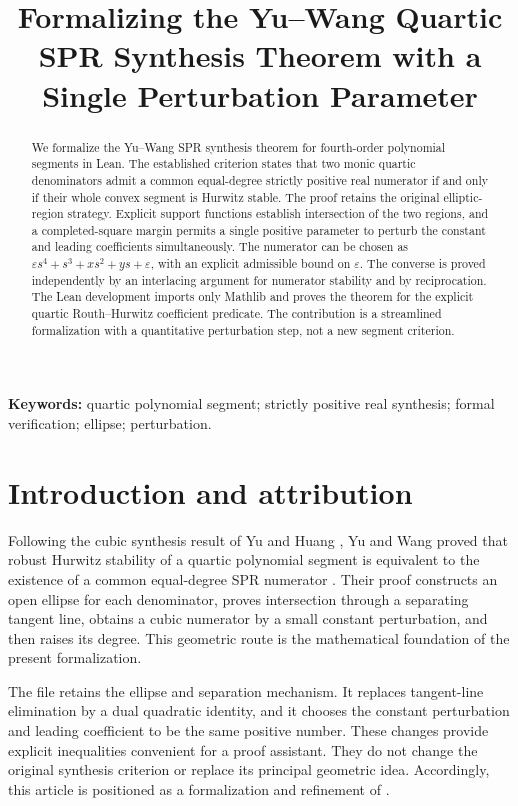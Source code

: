 \documentclass[11pt]{article}
\title{Formalizing the Yu--Wang Quartic SPR Synthesis Theorem with a Single Perturbation Parameter}
\begin{document}
\maketitle
\begin{abstract}
We formalize the Yu--Wang SPR synthesis theorem for fourth-order polynomial segments in Lean. The established criterion states that two monic quartic denominators admit a common equal-degree strictly positive real numerator if and only if their whole convex segment is Hurwitz stable. The proof retains the original elliptic-region strategy. Explicit support functions establish intersection of the two regions, and a completed-square margin permits a single positive parameter to perturb the constant and leading coefficients simultaneously. The numerator can be chosen as $\varepsilon s^4+s^3+xs^2+ys+\varepsilon$, with an explicit admissible bound on $\varepsilon$. The converse is proved independently by an interlacing argument for numerator stability and by reciprocation. The Lean development imports only Mathlib and proves the theorem for the explicit quartic Routh--Hurwitz coefficient predicate. The contribution is a streamlined formalization with a quantitative perturbation step, not a new segment criterion.
\end{abstract}
\noindent\textbf{Keywords:} quartic polynomial segment; strictly positive real synthesis; formal verification; ellipse; perturbation.

\section{Introduction and attribution}
Following the cubic synthesis result of Yu and Huang \cite{yuHuang1999}, Yu and Wang proved that robust Hurwitz stability of a quartic polynomial segment is equivalent to the existence of a common equal-degree SPR numerator \cite{yuWang2001Quartic}. Their proof constructs an open ellipse for each denominator, proves intersection through a separating tangent line, obtains a cubic numerator by a small constant perturbation, and then raises its degree. This geometric route is the mathematical foundation of the present formalization.

The file  retains the ellipse and separation mechanism. It replaces tangent-line elimination by a dual quadratic identity, and it chooses the constant perturbation and leading coefficient to be the same positive number. These changes provide explicit inequalities convenient for a proof assistant. They do not change the original synthesis criterion or replace its principal geometric idea. Accordingly, this article is positioned as a formalization and refinement of \cite{yuWang2001Quartic}.
\end{document}
